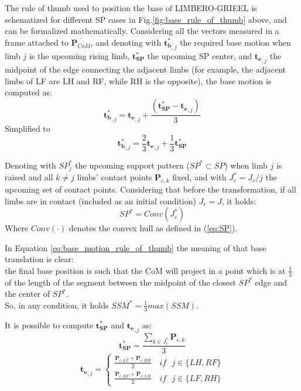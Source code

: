 The rule of thumb used to position the base of LIMBERO-GRIEEL is schematized for different SP cases in Fig.\ref{fig:base_rule_of_thumb} above, and can be formalized mathematically. Considering all the vectors measured in a frame attached to $\overline{\mathbf{P}_{CoM}}$, and denoting with $\mathbf{t^*_b}_{,j}$ the required base motion when limb $j$ is the upcoming rising limb, $\mathbf{t^*_{SP}}$ the upcoming SP center, and $\mathbf{t_e}_{,j}$ the midpoint of the edge connecting the adjacent limbs (for example, the adjacent limbs of LF are LH and RF, while RH is the opposite), the base motion is computed as:   
\begin{equation}
    \label{eq:base_motion_rule_of_thumb}
    \mathbf{t^*_b}_{,j} = \mathbf{t_e}_{,j} +  \frac{(\mathbf{t^*_{SP}} - \mathbf{t_e}_{,j})}{3} 
\end{equation}
Simplified to 
\begin{equation}
    \label{eq:base_motion_rule_of_thumb_final}
    \mathbf{t^*_b}_{,j} = \frac{2}{3}\mathbf{t_e}_{,j} + \frac{1}{3}\mathbf{t^*_{SP}} 
\end{equation}

Denoting with $SP_j^*$ the upcoming support pattern ($SP^* \subset SP$) when limb $j$ is raised and all $k\not=j$ limbs' contact points $\mathbf{P}_{c,k}$ fixed, and with $J_c^* = J_c/j$ the upcoming set of contact points. Considering that before the transformation, if all limbs are in contact (included as an initial condition) $J_c = J$, it holds: 
\begin{equation}
    \label{eq:upcoming_SP}
    SP^* = Conv(J_c^*) 
\end{equation}
Where $Conv(\cdot)$ denotes the convex hull as defined in (\ref{eq:SP}).

In Equation \ref{eq:base_motion_rule_of_thumb} the meaning of that base translation is clear:\\
the final base position is such that the CoM will project in a point which is at $\frac{1}{3}$ of the length of the segment between the midpoint of the closest $SP^*$ edge and the center of $SP^*$. \\
So, in any condition, it holds $SSM^* = \frac{1}{3}max(SSM)$.

It is possible to compute $\mathbf{t^*_{SP}}$ and $\mathbf{t_e}_{,j}$ as:
\begin{equation}
    \label{eq:SP_center}
    \mathbf{t^*_{SP}} = \frac{\sum_{k\in J^*_c}\mathbf{P}_{c,k}}{3}
\end{equation}
\begin{equation}
    \label{eq:middle_vec}
    \mathbf{t_e}_{,j} = 
    \begin{cases}
    \frac{\mathbf{P}_{c,LF} + \mathbf{P}_{c,RH} }{2} \quad if \text{ } j\in \{LH,RF\}
    \\
    \frac{\mathbf{P}_{c,RF} + \mathbf{P}_{c,LH} }{2} \quad if \text{ } j \in \{LF,RH\}
    \end{cases}
\end{equation}

